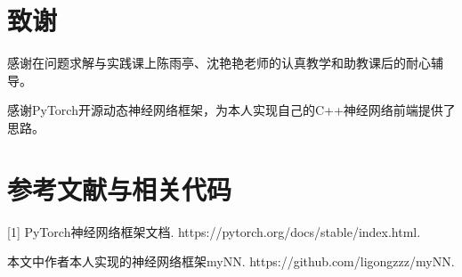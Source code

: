 \documentclass[CJK]{ctexart}
\begin{document}
\section{致谢}
感谢在问题求解与实践课上陈雨亭、沈艳艳老师的认真教学和助教课后的耐心辅导。\par
感谢PyTorch开源动态神经网络框架，为本人实现自己的C++神经网络前端提供了思路。

\section{参考文献与相关代码}
[1] PyTorch神经网络框架文档. https://pytorch.org/docs/stable/index.html.\par
[2]本文中作者本人实现的神经网络框架myNN. https://github.com/ligongzzz/myNN. 
\end{document}
